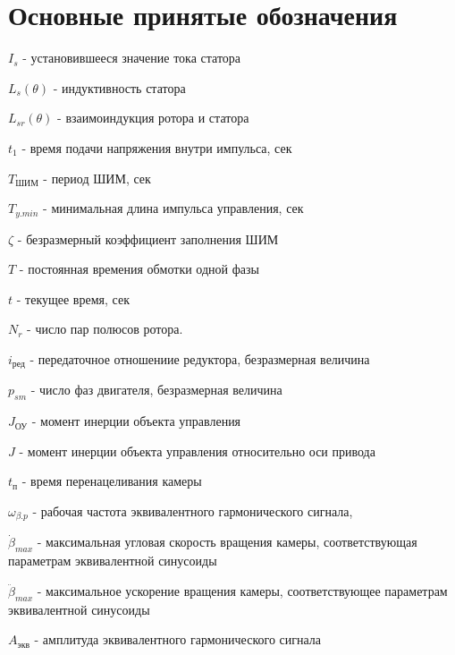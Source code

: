 \section{ Основные принятые обозначения }

$I_{s}$ - установившееся значение тока статора

$L_{s}(\theta)$ - индуктивность статора

$L_{sr}(\theta)$ - взаимоиндукция ротора и статора

$t_{1}$ - время подачи напряжения внутри импульса, сек

$T_\text{ШИМ}$ - период ШИМ, сек

$T_{y.min}$ - минимальная длина импульса управления, сек

$\zeta$ - безразмерный коэффициент заполнения ШИМ

$T$ - постоянная времения обмотки одной фазы

$t$ - текущее время, сек

$N_{r}$ - число пар полюсов ротора.

$i_\text{ред}$ - передаточное отношениие редуктора, безразмерная величина

$p_{sm}$ - число фаз двигателя, безразмерная величина

$J_{\text{ОУ}}$ - момент инерции объекта управления

$J$ - момент инерции объекта управления относительно оси привода

$t_\text{п}$ - время перенацеливания камеры

$\omega_{\beta.p}$ - рабочая частота эквивалентного гармонического сигнала,

$\dot{\beta}_{max}$ - максимальная угловая скорость вращения камеры, соответствующая параметрам эквивалентной синусоиды

$\ddot{\beta}_{max}$ - максимальное ускорение вращения камеры, соответствующее параметрам эквивалентной синусоиды

$A_\text{экв}$ - амплитуда эквивалентного гармонического сигнала
